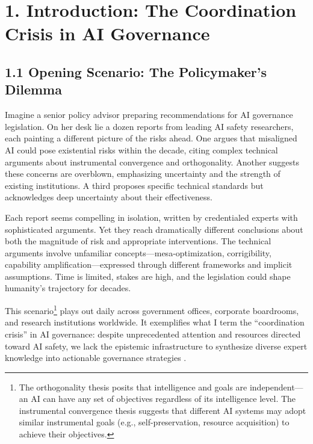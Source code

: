\documentclass[
  11pt,
  letterpaper,
]{book}
\begin{document}

\chapter{1. Introduction: The Coordination Crisis in AI
Governance}\label{introduction-the-coordination-crisis-in-ai-governance}

\section{1.1 Opening Scenario: The Policymaker's
Dilemma}\label{opening-scenario-the-policymakers-dilemma}

Imagine a senior policy advisor preparing recommendations for AI
governance legislation. On her desk lie a dozen reports from leading AI
safety researchers, each painting a different picture of the risks
ahead. One argues that misaligned AI could pose existential risks within
the decade, citing complex technical arguments about instrumental
convergence and orthogonality. Another suggests these concerns are
overblown, emphasizing uncertainty and the strength of existing
institutions. A third proposes specific technical standards but
acknowledges deep uncertainty about their effectiveness.

Each report seems compelling in isolation, written by credentialed
experts with sophisticated arguments. Yet they reach dramatically
different conclusions about both the magnitude of risk and appropriate
interventions. The technical arguments involve unfamiliar
concepts---mesa-optimization, corrigibility, capability
amplification---expressed through different frameworks and implicit
assumptions. Time is limited, stakes are high, and the legislation could
shape humanity's trajectory for decades.

This scenario\footnote{The orthogonality thesis posits that intelligence
  and goals are independent---an AI can have any set of objectives
  regardless of its intelligence level. The instrumental convergence
  thesis suggests that different AI systems may adopt similar
  instrumental goals (e.g., self-preservation, resource acquisition) to
  achieve their objectives.} plays out daily across government offices,
corporate boardrooms, and research institutions worldwide. It
exemplifies what I term the ``coordination crisis'' in AI governance:
despite unprecedented attention and resources directed toward AI safety,
we lack the epistemic infrastructure to synthesize diverse expert
knowledge into actionable governance strategies \textcite{todd2024}.
\end{document}

